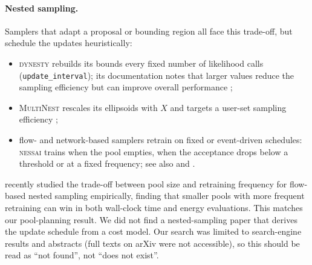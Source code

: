 \documentclass[11pt,a4paper]{article}
\newcommand{\code}[1]{\texttt{#1}}
\begin{document}
\paragraph{Nested sampling.} Samplers that adapt a proposal or bounding
region all face this trade-off, but schedule the updates heuristically:
\begin{itemize}
  \item \textsc{dynesty} rebuilds its bounds every fixed number of likelihood
        calls (\code{update\_interval}); its documentation notes that larger
        values reduce the sampling efficiency but can improve overall
        performance \citep{Speagle2020};
  \item \textsc{MultiNest} rescales its ellipsoids with $X$ and targets a
        user-set sampling efficiency \citep{Feroz2009};
  \item flow- and network-based samplers retrain on fixed or event-driven
        schedules: \textsc{nessai} trains when the pool empties, when the
        acceptance drops below a threshold or at a fixed frequency; see also
        \citet{Moss2020} and \citet{Lange2023}.
\end{itemize}
\citet{Coretti2026} recently studied the trade-off between pool size and
retraining frequency for flow-based nested sampling empirically, finding that
smaller pools with more frequent retraining can win in both wall-clock time
and energy evaluations. This matches our pool-planning result. We did not
find a nested-sampling paper that derives the update schedule from a cost
model. Our search was limited to search-engine results and abstracts (full
texts on arXiv were not accessible), so this should be read as ``not found'',
not ``does not exist''.
\end{document}
